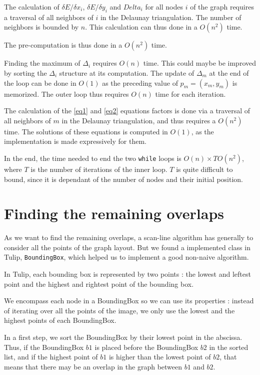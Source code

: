 \documentclass[12pt]{report}
\begin{document}
The calculation of  $\delta E / \delta x_i$, $\delta E / \delta y_i$ and $Delta_i$ for all nodes $i$ of the graph requires a traversal of all neighbors of $i$ in the Delaunay triangulation. The number of neighbors is bounded by $n$. This calculation can thus done in a $O(n^2)$ time.

The pre-computation is thus done in a $O(n^2)$ time.

Finding the maximum of $\Delta_i$ requires $O(n)$ time. This could maybe be improved by sorting the $\Delta_i$ structure at its computation. The update of $\Delta_m$ at the end of the loop can be done in $O(1)$ as the preceding value of $p_m = (x_m, y_m)$ is memorized. The outer loop thus requires $O(n)$ time for each iteration.

The calculation of the \ref{eq1} and \ref{eq2} equations factors is done via a traversal of all neighbors of $m$ in the Delaunay triangulation, and thus requires a $O(n^2)$ time.
The solutions of these equations is computed in $O(1)$, as the implementation is made expressively for them.

In the end, the time needed to end the two \texttt{while} loops is $O(n) \times T O(n^2)$, where $T$ is the number of iterations of the inner loop. $T$ is quite difficult to bound, since it is dependant of the number of nodes and their initial position.

\section{Finding the remaining overlaps}
As we want to find the remaining overlaps, a scan-line algorithm has generally to consider all the points of the graph layout. But we found a implemented class in Tulip, \texttt{BoundingBox}, which helped us to implement a good non-naive algorithm. 

\bigskip
In Tulip, each bounding box is represented by two points : the lowest and leftest point and the highest and rightest point of the bounding box.

We encompass each node in a BoundingBox so we can use its properties : instead of iterating over all the points of the image, we only use the lowest and the highest points of each BoundingBox. 

\bigskip
In a first step, we sort the BoundingBox by their lowest point in the abscissa. Thus, if the BoundingBox $b1$ is placed before the BoundingBox $b2$ in the sorted list, and if the highest point of $b1$ is higher than the lowest point of $b2$, that means that there may be an overlap in the graph between $b1$ and $b2$. 
\end{document}
